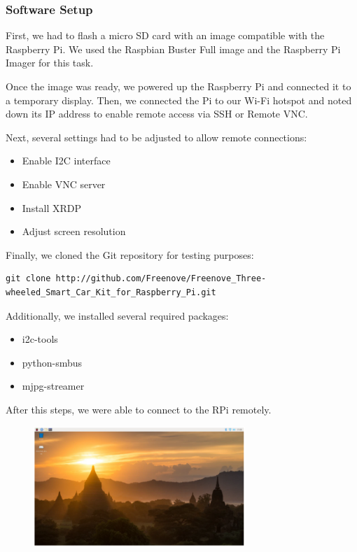 \subsubsection{Software Setup}

First, we had to flash a micro SD card with an image compatible with the Raspberry Pi. We used the Raspbian Buster Full image and the Raspberry Pi Imager for this task.

Once the image was ready, we powered up the Raspberry Pi and connected it to a temporary display. Then, we connected the Pi to our Wi-Fi hotspot and noted down its IP address to enable remote access via SSH or Remote VNC.

Next, several settings had to be adjusted to allow remote connections:
\begin{itemize}
    \item Enable I2C interface
    \item Enable VNC server
    \item Install XRDP
    \item Adjust screen resolution
\end{itemize}

Finally, we cloned the Git repository for testing purposes:
\begin{verbatim}
git clone http://github.com/Freenove/Freenove_Three-wheeled_Smart_Car_Kit_for_Raspberry_Pi.git
\end{verbatim}

Additionally, we installed several required packages:
\begin{itemize}
    \item i2c-tools
    \item python-smbus
    \item mjpg-streamer
\end{itemize}

After this steps, we were able to connect to the RPi remotely.
\begin{figure}[H]
    \includegraphics[width=8cm]{img/buster_desktop_background}
\end{figure}


